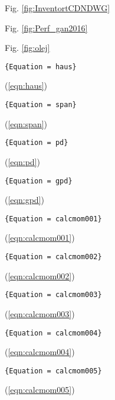 Fig. \ref{fig:InventortCDNDWG}

Fig. \ref{fig:Perf_gan2016}

Fig. \ref{fig:olej}

\begin{verbatim}{Equation = haus}\end{verbatim}
(\ref{eqn:haus})

\begin{verbatim}{Equation = span}\end{verbatim}
(\ref{eqn:span})

\begin{verbatim}{Equation = pd}\end{verbatim}
(\ref{eqn:pd})

\begin{verbatim}{Equation = gpd}\end{verbatim}
(\ref{eqn:gpd})

\begin{verbatim}{Equation = calcmom001}\end{verbatim}
(\ref{eqn:calcmom001})

\begin{verbatim}{Equation = calcmom002}\end{verbatim}
(\ref{eqn:calcmom002})

\begin{verbatim}{Equation = calcmom003}\end{verbatim}
(\ref{eqn:calcmom003})

\begin{verbatim}{Equation = calcmom004}\end{verbatim}
(\ref{eqn:calcmom004})

\begin{verbatim}{Equation = calcmom005}\end{verbatim}
(\ref{eqn:calcmom005})

